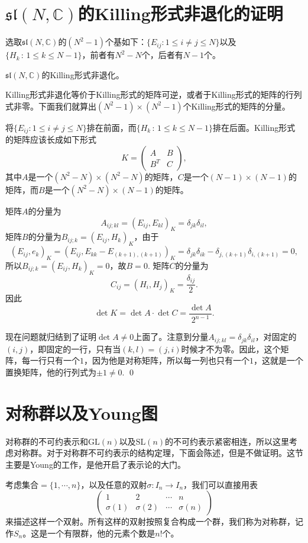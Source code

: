 \documentclass[10pt]{article}
\newcommand{\cc}{\mathbb{C}}
\begin{document}
\clearpage
\section{$\mathfrak{sl}(N,\cc)$的Killing形式非退化的证明}

选取$\mathfrak{sl}(N,\cc)$的$(N^2-1)$个基如下：$\{E_{ij}:1\leq i\neq j \leq N\}$以及$\{H_k\,:\, 1\leq k \leq N-1\}$，前者有$N^2-N$个，后者有$N-1$个。

\pro $\mathfrak{sl}(N,\cc)$的Killing形式非退化。

\proof Killing形式非退化等价于Killing形式的矩阵可逆，或者于Killing形式的矩阵的行列式非零。下面我们就算出$(N^2-1)\times (N^2-1)$个Killing形式的矩阵的分量。

将$\{E_{ij}:1\leq i\neq j \leq N\}$排在前面，而$\{H_k\,:\, 1\leq k \leq N-1\}$排在后面。Killing形式的矩阵应该长成如下形式
\[
K=\begin{pmatrix}
A&B\\
B^T&C
\end{pmatrix},
\]
其中$A$是一个$(N^2-N)\times (N^2-N)$的矩阵，$C$是一个$(N-1)\times (N-1)$的矩阵，而$B$是一个$(N^2-N)\times (N-1)$的矩阵。

矩阵$A$的分量为
\[
	A_{ij;kl}=(E_{ij},E_{kl})_K=\delta_{jk}\delta_{il},
\]
矩阵$B$的分量为$B_{ij;k}=(E_{ij},H_k)_K$，由于
\[
	(E_{ij},e_k)_K=(E_{ij},E_{kk}-E_{(k+1),(k+1)})_K=\delta_{jk}\delta_{ik}-\delta_{j,(k+1)}\delta_{i,(k+1)}=0,
\]
所以$B_{ij;k}=(E_{ij},H_k)_K=0$，故$B=0$. 矩阵$C$的分量为
\[
	C_{ij}=(H_i,H_j)_K=\frac{\delta_{ij}}{2}.
\]
因此
\[
\det K =\det A \cdot \det C = \frac{\det A}{2^{n-1}}.
\]

现在问题就归结到了证明$\det A\neq 0$上面了。注意到分量$A_{ij;kl}=\delta_{jk}\delta_{il}$，对固定的$(i,j)$，即固定的一行，只有当$(k,l)=(j,i)$时候才不为零。因此，这个矩阵，每一行只有一个$1$，因为他是对称矩阵，所以每一列也只有一个$1$，这就是一个置换矩阵，他的行列式为$\pm 1\neq 0$. \qed
\clearpage

\section{对称群以及Young图}

对称群的不可约表示和$\mathrm{GL}(n)$以及$\mathrm{SL}(n)$的不可约表示紧密相连，所以这里考虑对称群。对于对称群不可约表示的结构定理，下面会陈述，但是不做证明。这节主要是Young的工作，是他开启了表示论的大门。

\para 考虑集合$=\{1,\cdots,n\}$，以及任意的双射$\sigma : I_n\to I_n$，我们可以直接用表
\[
	\begin{pmatrix}
	1&2&\cdots &n\\
	\sigma(1)&\sigma(2)&\cdots &\sigma(n)
	\end{pmatrix}
\]
来描述这样一个双射。所有这样的双射按照复合构成一个群，我们称为对称群，记作$S_n$。这是一个有限群，他的元素个数是$n!$个。
\end{document}
